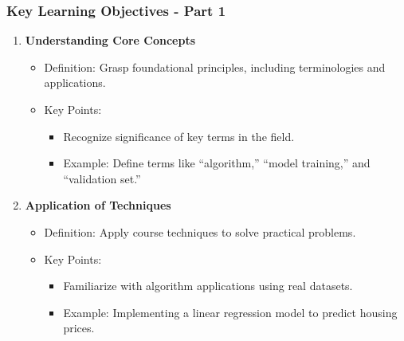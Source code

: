 \documentclass[aspectratio=169]{beamer}
\begin{document}
\begin{frame}[fragile]
    \frametitle{Key Learning Objectives - Part 1}
    \begin{enumerate}
        \item \textbf{Understanding Core Concepts}
        \begin{itemize}
            \item Definition: Grasp foundational principles, including terminologies and applications.
            \item Key Points:
            \begin{itemize}
                \item Recognize significance of key terms in the field.
                \item Example: Define terms like ``algorithm,'' ``model training,'' and ``validation set.''
            \end{itemize}
        \end{itemize}

        \item \textbf{Application of Techniques}
        \begin{itemize}
            \item Definition: Apply course techniques to solve practical problems.
            \item Key Points:
            \begin{itemize}
                \item Familiarize with algorithm applications using real datasets.
                \item Example: Implementing a linear regression model to predict housing prices.
            \end{itemize}
        \end{itemize}
    \end{enumerate}
\end{frame}
\end{document}
